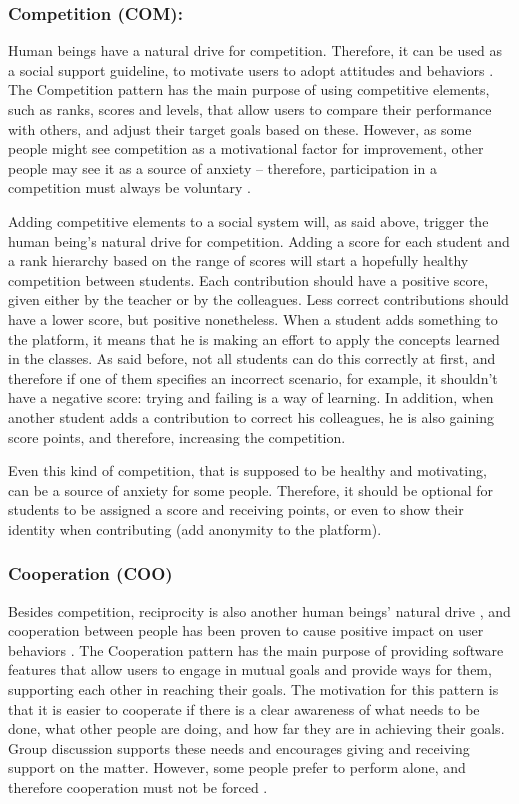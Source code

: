 \subsubsection{Competition (COM):}
Human beings have a natural drive for competition. Therefore, it can be used as a social support guideline, to motivate users to adopt attitudes and behaviors \cite{oinas2009persuasive}. The Competition pattern has the main purpose of using competitive elements, such as ranks, scores and levels, that allow users to compare their performance with others, and adjust their target goals based on these. However, as some people might see competition as a motivational factor for improvement, other people may see it as a source of anxiety – therefore, participation in a competition must always be voluntary \cite{oduor2014persuasive}.

Adding competitive elements to a social system will, as said above, trigger the human being's natural drive for competition. Adding a score for each student and a rank hierarchy based on the range of scores will start a hopefully healthy competition between students. Each contribution should have a positive score, given either by the teacher or by the colleagues. Less correct contributions should have a lower score, but positive nonetheless. When a student adds something to the platform, it means that he is making an effort to apply the concepts learned in the classes. As said before, not all students can do this correctly at first, and therefore if one of them specifies an incorrect scenario, for example, it shouldn't have a negative score: trying and failing is a way of learning. In addition, when another student adds a contribution to correct his colleagues, he is also gaining score points, and therefore, increasing the competition.

Even this kind of competition, that is supposed to be healthy and motivating, can be a source of anxiety for some people. Therefore, it should be optional for students to be assigned a score and receiving points, or even to show their identity when contributing (add anonymity to the platform). 

\subsubsection{Cooperation (COO)}
Besides competition, reciprocity is also another human beings' natural drive \cite{cialdini1993influence,malone1987making}, and cooperation between people has been proven to cause positive impact on user behaviors \cite{stibe2012exploring}. The Cooperation pattern has the main purpose of providing software features that allow users to engage in mutual goals and provide ways for them, supporting each other in reaching their goals. The motivation for this pattern is that it is easier to cooperate if there is a clear awareness of what needs to be done, what other people are doing, and how far they are in achieving their goals. Group discussion supports these needs and encourages giving and receiving support on the matter. However, some people prefer to perform alone, and therefore cooperation must not be forced \cite{oduor2014persuasive}. 

